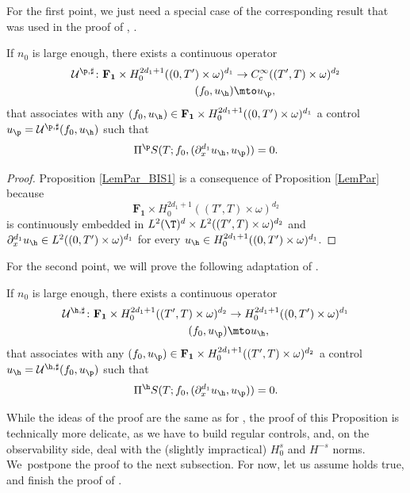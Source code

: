 For the first point, we just need a special case of the corresponding result that was used in the proof of , \ie {}.
\begin{prop}
\label{LemPar_BIS1}
If $n_0$ is large enough, there exists a continuous operator
\begin{align*}
\mathcal U^{\p,\sharp} \colon \mathbf{F_1} \times H^{2d_1+1}_0((0,T')\times\omega)^{d_1} & \to C^\infty_c((T',T)\times\omega)^{d_2} \\
(f_0,u_{\h}) &\mto u_{\p},
\end{align*}
that associates with any $(f_0,u_{\h})\in \mathbf{F_1} \times H^{2d_1+1}_0((0,T')\times\omega)^{d_1} $ a control $u_{\p}=\mathcal U^{\p,\sharp}(f_0,u_{\h})$ such that
\begin{equation*}
\Pi^{\p} S(T;f_0, (\partial_x^{d_1} u_{\h},u_{\p})) = 0.
\end{equation*}
\end{prop}
\begin{proof}
Proposition \ref{LemPar_BIS1} is a consequence of Proposition \ref{LemPar} because
\[
\mathbf{F_1} \times H^{2d_1+1}_0((T',T)\times\omega)^{d_2}
\]
is continuously embedded in $L^2(\T)^d \times L^2((T',T)\times \omega)^{d_2}$ and $\partial_x^{d_1} u_{\h} \in L^2((0,T')\times\omega)^{d_1}$ for every $u_{\h} \in H^{2d_1+1}_0((0,T')\times\omega)^{d_1}$.
\end{proof}

For the second point, we will prove the following adaptation of .
\begin{prop}
\label{LemHyp_BIS1}
If $n_0$ is large enough, there exists a continuous operator
\begin{align*}
\mathcal U^{\h,\sharp} \colon
\mathbf{F_1} \times H_0^{2d_1+1}((T',T)\times\omega)^{d_2} & \to H^{2d_1+1}_0((0,T')\times\omega)^{d_1}\\
(f_0,u_{\p}) &\mto u_{\h},
\end{align*}
that associates with any $(f_0,u_{\p})\in \mathbf{F_1} \times H^{2d_1+1}_0((T',T)\times\omega)^{d_2} $ a control $u_{\h}=\mathcal U^{\h,\sharp}(f_0,u_{\p})$ such that
\begin{equation}\label{eq:LemHyp_BIS1}
\Pi^{\h} S(T;f_0, (\partial_x^{d_1} u_{\h},u_{\p})) = 0.
\end{equation}
\end{prop}
While the ideas of the proof are the same as for , the proof of this Proposition is technically more delicate, as we have to build regular controls, and, on the observability side, deal with the (slightly impractical) $H^s_0$ and $H^{-s}$ norms. We~postpone the proof to the next subsection. For now, let us assume  holds true, and finish the proof of .

